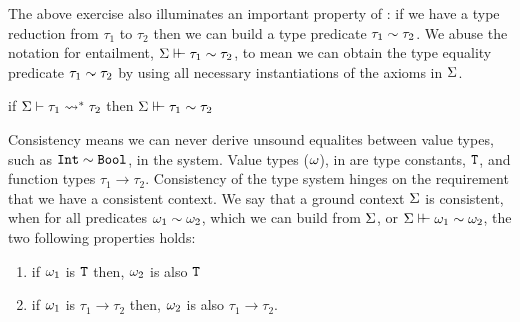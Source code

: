 \documentclass[format=acmsmall,manuscript,screen,nonacm,margin=1in,11pt]{acmart}
\begin{document}
The above exercise also illuminates an important property of \CLTF:
if we have a type reduction from $\tau_1$ to $\tau_2$ then we can build a type predicate $\tau_1\mathrel{\sim}\tau_2$.
We abuse the notation for entailment, $\Sigma\vdash\hspace{-0.7ex}\vdash\tau_1\mathrel{\sim}\tau_2$, to mean we can obtain the
type equality predicate $\tau_1\mathrel{\sim}\tau_2$ by using all necessary instantiations of the axioms in $\Sigma$.
\begin{lemma}
  if $\Sigma \vdash \tau_1 \rightsquigarrow^* \tau_2$ then $\Sigma\vdash\hspace{-0.7ex}\vdash\tau_1\mathrel{\sim}\tau_2$ 
\end{lemma}

Consistency means we can never derive unsound equalites between value types,
such as $\texttt{Int}\mathrel{\sim}\texttt{Bool}$, in the system. Value types ($\omega$), in \CLTF are
type constants, $\texttt{T}$, and function types $\tau_1\to\tau_2$.
Consistency of the type system hinges on the requirement that we have a consistent context.
We say that a ground context $\Sigma$ is consistent, when for all predicates $\omega_1 \mathrel{\sim} \omega_2$,
which we can build from $\Sigma$, or $\Sigma\vdash\hspace{-0.7ex}\vdash\omega_1\mathrel{\sim}\omega_2$, the two following properties holds:
\begin{enumerate}
\item if $\omega_1$ is $\texttt{T}$ then, $\omega_2$ is also $\texttt{T}$
\item if $\omega_1$ is $\tau_1\to\tau_2$ then, $\omega_2$ is also $\tau_1\to\tau_2$.
\end{enumerate}
\end{document}
